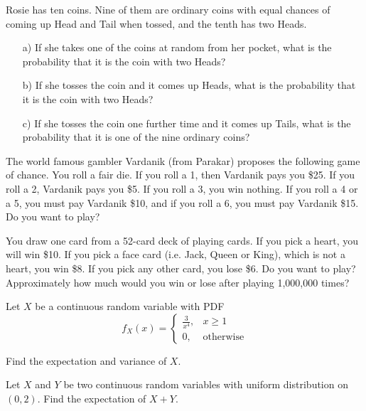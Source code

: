 \bigskip

\begin{problem}[1 point]
    Rosie has ten coins. Nine of them are ordinary coins with equal chances of coming up Head and Tail when tossed, and the tenth has two Heads.
    
    \begin{enumerate}
        \item[a) ] If she takes one of the coins at random from her pocket, what is the probability that it is the coin
with two Heads?

        \item[b) ] If she tosses the coin and it comes up Heads, what is the probability that it is the coin with two Heads?

        \item[c) ] If she tosses the coin one further time and it comes up Tails, what is the probability that it is one of
the nine ordinary coins?

    \end{enumerate}
\end{problem}
\bigskip
\begin{problem}[1 point]
    The world famous gambler Vardanik (from Parakar) proposes the following game of chance. You roll a fair die. If you roll a 1, then Vardanik pays you \$25. If you roll a 2, 
Vardanik pays you \$5. If you roll a 3, you win nothing. If you roll a 4 or a 5, you must 
pay Vardanik \$10, and if you roll a 6, you must pay Vardanik \$15. Do you want to play? 
\end{problem}
\bigskip
\begin{problem}[1 point]
    You draw one card from a 52-card deck of playing cards. If you pick a heart, you will win 
\$10. If you pick a face card (i.e. Jack, Queen or King), which is not a heart, you win \$8. If you pick any other card, 
you lose \$6. Do you want to play? Approximately how much would you win or lose after playing 1,000,000 times?
\end{problem}
\bigskip
\begin{problem}[1 point]
    Let $X$ be a continuous random variable with PDF
\[
f_X(x) = \begin{cases}
    \frac{3}{x^4},& x \ge 1 \\
    0,& \text{otherwise}
\end{cases}
\]

Find the expectation and variance of $X$.
\end{problem}
\bigskip
\begin{problem}[0.5 points]
    Let $X$ and $Y$ be two continuous random variables with uniform distribution on $(0,2)$. Find the expectation of $X+Y$.
\end{problem}

